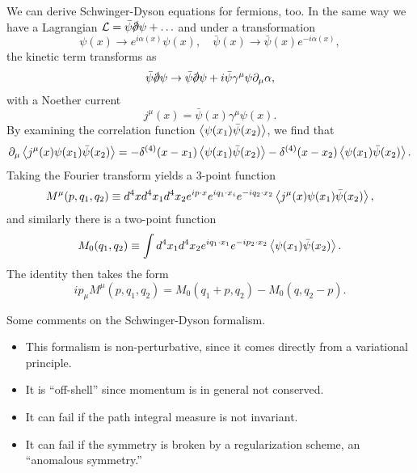 We can derive Schwinger-Dyson equations for fermions, too. In the same way we have a Lagrangian $\cL=\bar \psi \slashed{\p} \psi+\ldots$ and under a transformation
\begin{equation}
    \psi(x) \to e^{i\alpha(x)}\psi(x), \quad \bar \psi(x)\to \bar \psi(x) e^{-i\alpha(x)},
\end{equation}
the kinetic term transforms as
\begin{equation}
    \bar \psi \slashed{\p} \psi \to \bar \psi \slashed{\p} \psi + i \bar \psi \gamma^\mu \psi \p_\mu \alpha,
\end{equation}
with a Noether current
\begin{equation}
    j^\mu(x) = \bar \psi(x) \gamma^\mu \psi(x).
\end{equation}
By examining the correlation function $\left< \psi(x_1) \bar \psi(x_2) \right>$, we find that
\begin{equation}
    \partial_\mu \left< j^\mu(x) \psi(x_1) \bar \psi(x_2) \right> =-\delta^{(4)}(x-x_1)\left< \psi(x_1) \bar \psi(x_2) \right> - \delta^{(4)}(x-x_2) \left< \psi(x_1)\bar \psi(x_2) \right>.
\end{equation}
Taking the Fourier transform yields a 3-point function
\begin{equation}
     M^\mu(p,q_1,q_2) \equiv d^4x d^4 x_1 d^4 x_2 e^{ip\cdot x} e^{iq_1 \cdot x_i} e^{-iq_2 \cdot x_2} \left<  j^\mu(x) \psi(x_1) \bar \psi(x_2) \right>,
\end{equation}
and similarly there is a two-point function
\begin{equation}
    M_0(q_1,q_2) \equiv \int d^4 x_1 d^4 x_2 e^{iq_1 \cdot x_1} e^{-ip_2 \cdot x_2} \left< \psi(x_1) \bar \psi(x_2) \right>.
\end{equation}
The identity then takes the form
\begin{equation}
    i p_\mu M^\mu(p,q_1,q_2) = M_0(q_1+p,q_2) -M_0(q,q_2-p).
\end{equation}

Some comments on the Schwinger-Dyson formalism.
\begin{itemize}
    \item This formalism is non-perturbative, since it comes directly from a variational principle.
    \item It is ``off-shell'' since momentum is in general not conserved.
    \item It can fail if the path integral measure is not invariant.
    \item It can fail if the symmetry is broken by a regularization scheme, an ``anomalous symmetry.''
\end{itemize}

